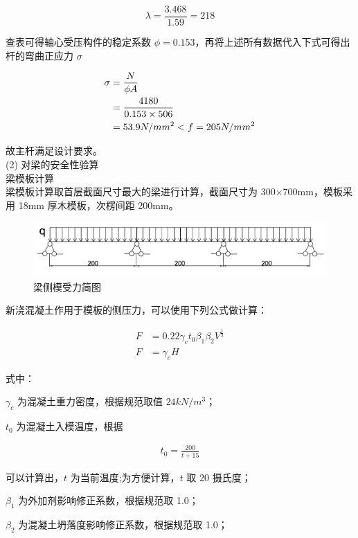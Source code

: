 \[
    \lambda = \frac{3.468}{1.59}=218
\]

查表可得轴心受压构件的稳定系数 $\phi =0.153$，再将上述所有数据代入下式可得出杆的弯曲正应力 $\sigma $

\begin{align}
\sigma &=\frac{N}{\phi A}\\
&=\frac{4180}{0.153\times 506} \notag\\
&=53.9 N/mm^2<f=205 N/mm^2 \notag
\end{align}

故主杆满足设计要求。\\

(2) 对梁的安全性验算\\

 梁模板计算\\

梁模板计算取首层截面尺寸最大的梁进行计算，截面尺寸为 300×700mm，模板采用 18mm
厚木模板，次楞间距 200mm。

\begin{figure}[thbp!]
    \centering
    \includegraphics[width=1.0\linewidth]{figure/c5f3.png}
    \caption{梁侧模受力简图}
    \label{fig:c5f3}
\end{figure}

新浇混凝土作用于模板的侧压力，可以使用下列公式做计算：

\begin{align}
    \label{fx:5.7}
    F&=0.22\gamma_c t_0\beta_1 \beta_2V^{\frac{1}{2}}\\
    \label{fx:5.7a}
    F&=\gamma_c H
\end{align}

式中：

$\gamma_c$ 为混凝土重力密度，根据规范取值 $24 kN/m^3$；

$t_0$ 为混凝土入模温度，根据

\begin{align}
\label{fx:5.8}
t_0=\frac{200}{t+15}
\end{align}

可以计算出，$t$ 为当前温度;为方便计算，$t$ 取 20 摄氏度；

$\beta_1$ 为外加剂影响修正系数，根据规范取 1.0；

$\beta_2$ 为混凝土坍落度影响修正系数，根据规范取 1.0；

